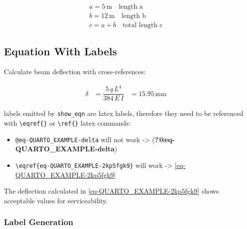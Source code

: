 \documentclass[
  letterpaper,
  DIV=11,
  numbers=noendperiod,
  fleqn]{scrartcl}
\providecommand{\tightlist}{%
  \setlength{\itemsep}{0pt}\setlength{\parskip}{0pt}}
\begin{document}
\begin{gather*}
a  = 5{\,}\text{m}  \quad\text{length a}  \\[8pt]
 b  = 12{\,}\text{m}  \quad\text{length b}  \\[8pt]
 c  = a + b  \quad\text{total length c} 
\end{gather*}

\subsection{Equation With Labels}\label{sec-beam-calc}

Calculate beam deflection with cross-references:

\begin{align}
\delta & = \dfrac{5{\,}q{\,}L^{4}}{384{\,}E{\,}I} & = 15.95{\,}\text{mm}  \label{eq-QUARTO_EXAMPLE-2kp5fgk9} 
\end{align}

\begin{tcolorbox}[enhanced jigsaw, colback=white, toprule=.15mm, coltitle=black, arc=.35mm, opacitybacktitle=0.6, rightrule=.15mm, opacityback=0, leftrule=.75mm, titlerule=0mm, colbacktitle=quarto-callout-note-color!10!white, left=2mm, bottomtitle=1mm, breakable, toptitle=1mm, title=\textcolor{quarto-callout-note-color}{\faInfo}\hspace{0.5em}{Note}, bottomrule=.15mm, colframe=quarto-callout-note-color-frame]

labels emitted by \texttt{show\_eqn} are latex labels, therefore they
need to be referenced with \texttt{\textbackslash{}eqref\{\}} or
\texttt{\textbackslash{}ref\{\}} latex commands:

\begin{itemize}
\tightlist
\item
  \texttt{@eq-QUARTO\_EXAMPLE-delta} will not work -\textgreater{}
  (\textbf{?@eq-QUARTO\_EXAMPLE-delta})
\item
  \texttt{\textbackslash{}eqref\{eq-QUARTO\_EXAMPLE-2kp5fgk9\}} will
  work -\textgreater{} \eqref{eq-QUARTO_EXAMPLE-2kp5fgk9}
\end{itemize}

\end{tcolorbox}

The deflection calculated in \eqref{eq-QUARTO_EXAMPLE-2kp5fgk9} shows
acceptable values for serviceability.

\subsubsection{Label Generation}\label{label-generation}
\end{document}
